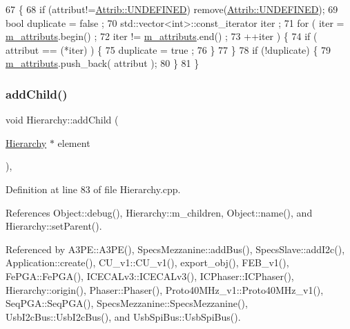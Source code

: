 \begin{DoxyCode}
67                             \{
68     \textcolor{keywordflow}{if} (attribut!=\hyperlink{classAttrib_a69e171d7cc6417835a5a306d3c764235a3a8da2ab97dda18aebab196fe4100531}{Attrib::UNDEFINED}) \textcolor{keyword}{remove}(\hyperlink{classAttrib_a69e171d7cc6417835a5a306d3c764235a3a8da2ab97dda18aebab196fe4100531}{Attrib::UNDEFINED});
69     \textcolor{keywordtype}{bool} duplicate = false ;
70     std::vector<int>::const\_iterator iter ;
71     \textcolor{keywordflow}{for} ( iter  = \hyperlink{classAttrib_ac4bd58a0cc6b38a3b711d609a3d3aacc}{m\_attributs}.begin() ;
72           iter != \hyperlink{classAttrib_ac4bd58a0cc6b38a3b711d609a3d3aacc}{m\_attributs}.end()   ;
73           ++iter ) \{
74       \textcolor{keywordflow}{if} ( attribut == (*iter) ) \{
75         duplicate = true ;
76       \}
77     \}
78     \textcolor{keywordflow}{if} (!duplicate) \{
79       \hyperlink{classAttrib_ac4bd58a0cc6b38a3b711d609a3d3aacc}{m\_attributs}.push\_back( attribut );
80     \}
81   \}
\end{DoxyCode}
\mbox{\label{classHierarchy_ad677774ff38fcb257c04a3a10d471fac}} 
\subsubsection{\texorpdfstring{add\+Child()}{addChild()}}
{\footnotesize\ttfamily void Hierarchy\+::add\+Child (\begin{DoxyParamCaption}\item[{\hyperlink{classHierarchy}{Hierarchy} $\ast$}]{element }\end{DoxyParamCaption})\hspace{0.3cm}{\ttfamily [virtual]}, {\ttfamily [inherited]}}



Definition at line 83 of file Hierarchy.\+cpp.



References Object\+::debug(), Hierarchy\+::m\+\_\+children, Object\+::name(), and Hierarchy\+::set\+Parent().



Referenced by A3\+P\+E\+::\+A3\+P\+E(), Specs\+Mezzanine\+::add\+Bus(), Specs\+Slave\+::add\+I2c(), Application\+::create(), C\+U\+\_\+v1\+::\+C\+U\+\_\+v1(), export\+\_\+obj(), F\+E\+B\+\_\+v1(), Fe\+P\+G\+A\+::\+Fe\+P\+G\+A(), I\+C\+E\+C\+A\+Lv3\+::\+I\+C\+E\+C\+A\+Lv3(), I\+C\+Phaser\+::\+I\+C\+Phaser(), Hierarchy\+::origin(), Phaser\+::\+Phaser(), Proto40\+M\+Hz\+\_\+v1\+::\+Proto40\+M\+Hz\+\_\+v1(), Seq\+P\+G\+A\+::\+Seq\+P\+G\+A(), Specs\+Mezzanine\+::\+Specs\+Mezzanine(), Usb\+I2c\+Bus\+::\+Usb\+I2c\+Bus(), and Usb\+Spi\+Bus\+::\+Usb\+Spi\+Bus().


